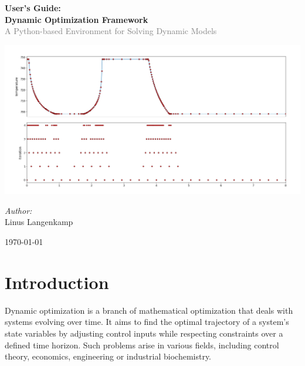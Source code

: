 \documentclass[12pt]{article}
\date{\today}
\begin{document}
\begin{titlepage}
	\centering

	\vspace*{2cm}

	{\Huge\bfseries User's Guide:}\\[1em]

	{\Huge\bfseries Dynamic Optimization Framework}\\[0.5em]
	\textcolor{gray}{\large A Python-based Environment for Solving
		Dynamic Models}\\[1em]

	\vspace{2cm}

	\includegraphics[width=1\textwidth]{images/refinement.png}\par\vspace{1cm}
	\vspace{2cm}

	{\large \textit{Author:}}\\[0.5em]
	{\large Linus Langenkamp}

	\vfill

	{\large \today}

	\vspace*{1cm}
\end{titlepage}

\newpage
\tableofcontents
\newpage

\section{Introduction}

Dynamic optimization is a branch of mathematical optimization that
deals with systems evolving over time. It aims to find the optimal trajectory
of a system's state variables by adjusting control inputs while respecting
constraints over a defined time horizon. Such problems arise in various fields,
including control theory, economics, engineering or industrial biochemistry.
\end{document}
